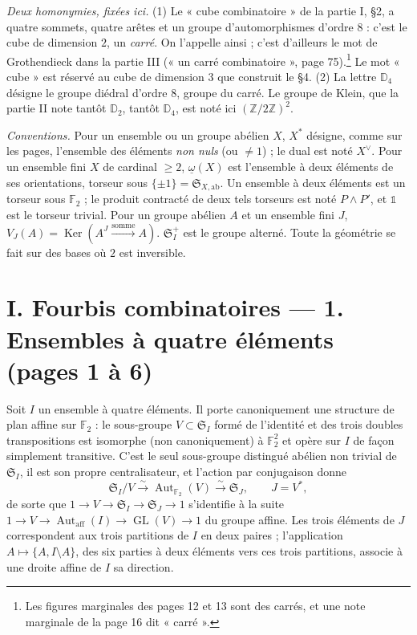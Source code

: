\documentclass[11pt,a4paper]{article}
\begin{document}
\emph{Deux homonymies, fixées ici.} (1) Le « cube combinatoire » de la partie I,
§2, a quatre sommets, quatre arêtes et un groupe d'automorphismes d'ordre $8$ :
c'est le cube de dimension $2$, un \emph{carré}. On l'appelle ainsi ; c'est
d'ailleurs le mot de Grothendieck dans la partie III (« un carré
combinatoire », page 75).\footnote{Les figures marginales des pages 12 et 13
sont des carrés, et une note marginale de la page 16 dit « carré ».} Le mot
« cube » est réservé au cube de dimension $3$ que construit le §4. (2) La lettre
$\mathbb{D}_4$ désigne le groupe diédral d'ordre $8$, groupe du carré. Le
groupe de Klein, que la partie II note tantôt $\mathbb{D}_2$, tantôt
$\mathbb{D}_4$, est noté ici $(\mathbb{Z}/2\mathbb{Z})^2$.

\emph{Conventions.} Pour un ensemble ou un groupe abélien $X$, $X^{*}$ désigne,
comme sur les pages, l'ensemble des éléments \emph{non nuls} (ou $\neq 1$) ; le
dual est noté $X^{\vee}$. Pour un ensemble fini $X$ de cardinal $\geq 2$,
$\underline{\omega}(X)$ est l'ensemble à deux éléments de ses orientations,
torseur sous $\{\pm 1\} = \mathfrak{S}_{X,\mathrm{ab}}$. Un ensemble à deux
éléments est un torseur sous $\mathbb{F}_2$ ; le produit contracté de deux tels
torseurs est noté $P \wedge P'$, et $\mathbb{1}$ est le torseur trivial.
Pour un groupe abélien $A$ et un ensemble fini $J$,
$V_J(A) = \operatorname{Ker}(A^J \xrightarrow{\text{somme}} A)$.
$\mathfrak{S}_I^{+}$ est le groupe alterné. Toute la géométrie se fait sur des
bases où $2$ est inversible.

\section*{I. Fourbis combinatoires --- 1. Ensembles à quatre éléments (pages 1 à 6)}

Soit $I$ un ensemble à quatre éléments. Il porte canoniquement une structure
de plan affine sur $\mathbb{F}_2$ : le sous-groupe $V \subset \mathfrak{S}_I$
formé de l'identité et des trois doubles transpositions est isomorphe (non
canoniquement) à $\mathbb{F}_2^2$ et opère sur $I$ de façon simplement
transitive. C'est le seul sous-groupe distingué abélien non trivial de
$\mathfrak{S}_I$, il est son propre centralisateur, et l'action par
conjugaison donne
\[
\mathfrak{S}_I / V \xrightarrow{\;\sim\;} \operatorname{Aut}_{\mathbb{F}_2}(V)
\xrightarrow{\;\sim\;} \mathfrak{S}_J, \qquad J = V^{*},
\]
de sorte que $1 \to V \to \mathfrak{S}_I \to \mathfrak{S}_J \to 1$ s'identifie
à la suite $1 \to V \to \operatorname{Aut}_{\mathrm{aff}}(I) \to
\operatorname{GL}(V) \to 1$ du groupe affine. Les trois éléments de $J$
correspondent aux trois partitions de $I$ en deux paires ; l'application
$A \mapsto \{A, I \setminus A\}$, des six parties à deux éléments vers ces
trois partitions, associe à une droite affine de $I$ sa direction.
\end{document}
